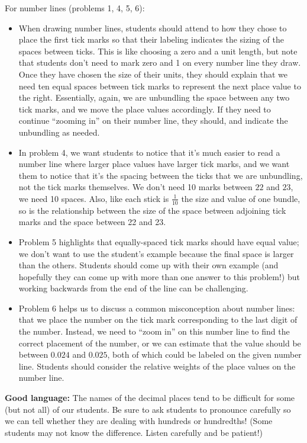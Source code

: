 \documentclass{ximera}
\begin{document}
\begin{instructorNotes}
For number lines (problems 1, 4, 5, 6):

\begin{itemize}
	\item When drawing number lines, students should attend to how they chose to place the first tick marks so that their labeling indicates the sizing of the spaces between ticks. This is like choosing a zero and a unit length, but note that students don't need to mark zero and 1 on every number line they draw. Once they have chosen the size of their units, they should explain that we need ten equal spaces between tick marks to represent the next place value to the right. Essentially, again, we are unbundling the space between any two tick marks, and we move the place values accordingly. If they need to continue ``zooming in'' on their number line, they should, and indicate the unbundling as needed.
	\item In problem 4, we want students to notice that it's much easier to read a number line where larger place values have larger tick marks, and we want them to notice that it's the spacing between the ticks that we are unbundling, not the tick marks themselves. We don't need 10 marks between $22$ and $23$, we need 10 spaces. Also, like each stick is $\frac{1}{10}$ the size and value of one bundle, so is the relationship between the size of the space between adjoining tick marks and the space between 22 and 23.
    \item  Problem 5 highlights that equally-spaced tick marks should have equal value; we don't want to use the student's example because the final space is larger than the others. Students should come up with their own example (and hopefully they can come up with more than one answer to this problem!) but working backwards from the end of the line can be challenging.
    \item Problem 6 helps us to discuss a common misconception about number lines: that we place the number on the tick mark corresponding to the last digit of the number. Instead, we need to ``zoom in'' on this number line to find the correct placement of the number, or we can estimate that the value should be between $0.024$ and $0.025$, both of which could be labeled on the given number line. Students should consider the relative weights of the place values on the number line.
    
\end{itemize}



{\bf Good language:} The names of the decimal places tend to be difficult for some (but not all) of our students. Be sure to ask students to pronounce carefully so we can tell whether they are dealing with hundreds or hundredths! (Some students may not know the difference. Listen carefully and be patient!)


\end{instructorNotes}
\end{document}
